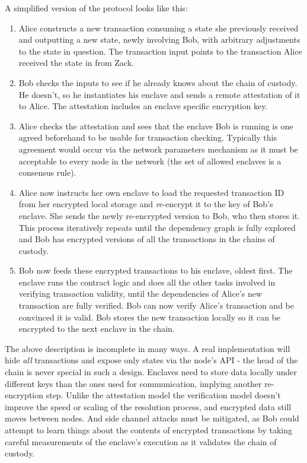 \documentclass{article}
\begin{document}
A simplified version of the protocol looks like this:

\begin{enumerate}
    \item Alice constructs a new transaction consuming a state she previously received and outputting a new state,
          newly involving Bob, with arbitrary adjustments to the state in question. The transaction input points
          to the transaction Alice received the state in from Zack.
    \item Bob checks the inputs to see if he already knows about the chain of custody. He doesn't, so he
          instantiates his enclave and sends a remote attestation of it to Alice. The attestation includes an enclave
          specific encryption key.
    \item Alice checks the attestation and sees that the enclave Bob is running is one agreed beforehand
          to be usable for transaction checking. Typically this agreement would occur via the network parameters
          mechanism as it must be acceptable to every node in the network (the set of allowed enclaves is a
          consensus rule).
    \item Alice now instructs her own enclave to load the requested transaction ID from her encrypted local storage
          and \emph{re}-encrypt it to the key of Bob's enclave. She sends the newly re-encrypted version to Bob,
          who then stores it. This process iteratively repeats until the dependency graph is fully explored and Bob
          has encrypted versions of all the transactions in the chains of custody.
    \item Bob now feeds these encrypted transactions to his enclave, oldest first. The enclave runs the contract
          logic and does all the other tasks involved in verifying transaction validity, until the dependencies
          of Alice's new transaction are fully verified. Bob can now verify Alice's transaction and be convinced
          it is valid. Bob stores the new transaction locally so it can be encrypted to the next enclave in the
          chain.
\end{enumerate}

The above description is incomplete in many ways. A real implementation will hide \emph{all} transactions and
expose only states via the node's API - the head of the chain is never special in such a design. Enclaves need to
store data locally under different keys than the ones used for communication, implying another re-encryption step.
Unlike the attestation model the verification model doesn't improve the speed or scaling of the resolution
process, and encrypted data still moves between nodes. And side channel attacks must be mitigated, as Bob could
attempt to learn things about the contents of encrypted transactions by taking careful measurements of the
enclave's execution as it validates the chain of custody.
\end{document}
